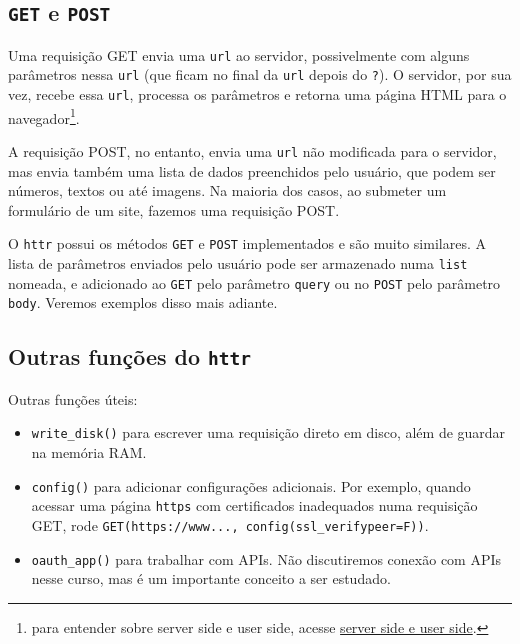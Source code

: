 \documentclass[]{book}
\providecommand{\tightlist}{%
  \setlength{\itemsep}{0pt}\setlength{\parskip}{0pt}}
\let\rmarkdownfootnote\footnote%
\def\footnote{\protect\rmarkdownfootnote}
\begin{document}
\subsection{\texorpdfstring{\texttt{GET} e
\texttt{POST}}{GET e POST}}\label{get-e-post}

Uma requisição GET envia uma \texttt{url} ao servidor, possivelmente com
alguns parâmetros nessa \texttt{url} (que ficam no final da \texttt{url}
depois do \texttt{?}). O servidor, por sua vez, recebe essa
\texttt{url}, processa os parâmetros e retorna uma página HTML para o
navegador\footnote{para entender sobre server side e user side, acesse
  \href{http://programmers.stackexchange.com/a/171210}{server side e
  user side}.}.

A requisição POST, no entanto, envia uma \texttt{url} não modificada
para o servidor, mas envia também uma lista de dados preenchidos pelo
usuário, que podem ser números, textos ou até imagens. Na maioria dos
casos, ao submeter um formulário de um site, fazemos uma requisição
POST.

O \texttt{httr} possui os métodos \texttt{GET} e \texttt{POST}
implementados e são muito similares. A lista de parâmetros enviados pelo
usuário pode ser armazenado numa \texttt{list} nomeada, e adicionado ao
\texttt{GET} pelo parâmetro \texttt{query} ou no \texttt{POST} pelo
parâmetro \texttt{body}. Veremos exemplos disso mais adiante.

\subsection{\texorpdfstring{Outras funções do
\texttt{httr}}{Outras funções do httr}}\label{outras-funcoes-do-httr}

Outras funções úteis:

\begin{itemize}
\tightlist
\item
  \texttt{write\_disk()} para escrever uma requisição direto em disco,
  além de guardar na memória RAM.
\item
  \texttt{config()} para adicionar configurações adicionais. Por
  exemplo, quando acessar uma página \texttt{https} com certificados
  inadequados numa requisição GET, rode
  \texttt{GET(\textquotesingle{}https://www...\textquotesingle{},\ config(ssl\_verifypeer=F))}.
\item
  \texttt{oauth\_app()} para trabalhar com APIs. Não discutiremos
  conexão com APIs nesse curso, mas é um importante conceito a ser
  estudado.
\end{itemize}
\end{document}
